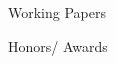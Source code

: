 \documentclass{resume} %
\begin{document}
\begin{rSection}{Working Papers}
\begin{rSection}{Honors/ Awards}
\begin{itemize}
\end{itemize}
\end{rSection}
\vspace{-1em}


\end{rSection}
\end{document}
